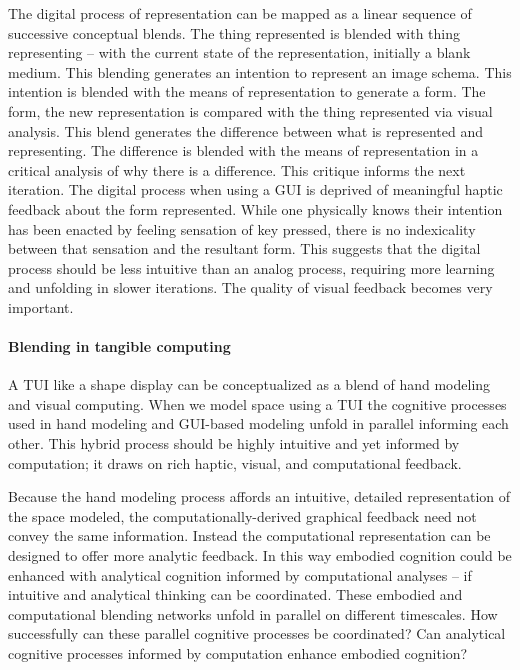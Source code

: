 \documentclass{article}
\begin{document}
The digital process of representation can be mapped as a linear sequence of successive conceptual blends. The thing represented is blended with thing representing -- with the current state of the representation, initially a blank medium. This blending generates an intention to represent an image schema. This intention is blended with the means of representation to generate a form. The form, the new representation is compared with the thing represented via visual analysis. This blend generates the difference between what is represented and representing. The difference is blended with the means of representation in a critical analysis of why there is a difference. This critique informs the next iteration. The digital process when using a GUI is deprived of meaningful haptic feedback about the form represented. While one physically knows their intention has been enacted by feeling sensation of key pressed, there is no indexicality between that sensation and the resultant form. This suggests that the digital process should be less intuitive than an analog process, requiring more learning and unfolding in slower iterations. The quality of visual feedback becomes very important. %


\paragraph{Blending in tangible computing}
A TUI like a shape display can be conceptualized as a blend of hand modeling and visual computing. 
When we model space using a TUI 
the cognitive processes used in hand modeling and GUI-based modeling unfold in parallel informing each other. 
This hybrid process should be highly intuitive and yet informed by computation; it draws on rich haptic, visual, and computational feedback. 

Because the hand modeling process affords an intuitive, detailed representation of the space modeled, 
the computationally-derived graphical feedback need not convey the same information. 
Instead the computational representation can be designed to offer more analytic feedback. 
In this way embodied cognition could be enhanced with analytical cognition informed by computational analyses
-- if intuitive and analytical thinking can be coordinated. 
These embodied and computational blending networks unfold in parallel on different timescales. 
How successfully can these parallel cognitive processes be coordinated?
Can analytical cognitive processes informed by computation enhance embodied cognition? 
\end{document}

